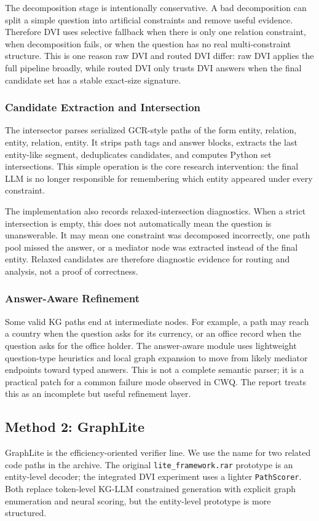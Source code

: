 \documentclass[10pt,twocolumn]{article}
\newcommand{\code}[1]{\texttt{#1}}
\begin{document}
The decomposition stage is intentionally conservative. A bad decomposition can split a simple question into artificial constraints and remove useful evidence. Therefore DVI uses selective fallback when there is only one relation constraint, when decomposition fails, or when the question has no real multi-constraint structure. This is one reason raw DVI and routed DVI differ: raw DVI applies the full pipeline broadly, while routed DVI only trusts DVI answers when the final candidate set has a stable exact-size signature.

\subsubsection{Candidate Extraction and Intersection}
The intersector parses serialized GCR-style paths of the form entity, relation, entity, relation, entity. It strips path tags and answer blocks, extracts the last entity-like segment, deduplicates candidates, and computes Python set intersections. This simple operation is the core research intervention: the final LLM is no longer responsible for remembering which entity appeared under every constraint.

The implementation also records relaxed-intersection diagnostics. When a strict intersection is empty, this does not automatically mean the question is unanswerable. It may mean one constraint was decomposed incorrectly, one path pool missed the answer, or a mediator node was extracted instead of the final entity. Relaxed candidates are therefore diagnostic evidence for routing and analysis, not a proof of correctness.

\subsubsection{Answer-Aware Refinement}
Some valid KG paths end at intermediate nodes. For example, a path may reach a country when the question asks for its currency, or an office record when the question asks for the office holder. The answer-aware module uses lightweight question-type heuristics and local graph expansion to move from likely mediator endpoints toward typed answers. This is not a complete semantic parser; it is a practical patch for a common failure mode observed in CWQ. The report treats this as an incomplete but useful refinement layer.

\subsection{Method 2: GraphLite}
GraphLite is the efficiency-oriented verifier line. We use the name for two related code paths in the archive. The original \code{lite\_framework.rar} prototype is an entity-level decoder; the integrated DVI experiment uses a lighter \code{PathScorer}. Both replace token-level KG-LLM constrained generation with explicit graph enumeration and neural scoring, but the entity-level prototype is more structured.
\end{document}
